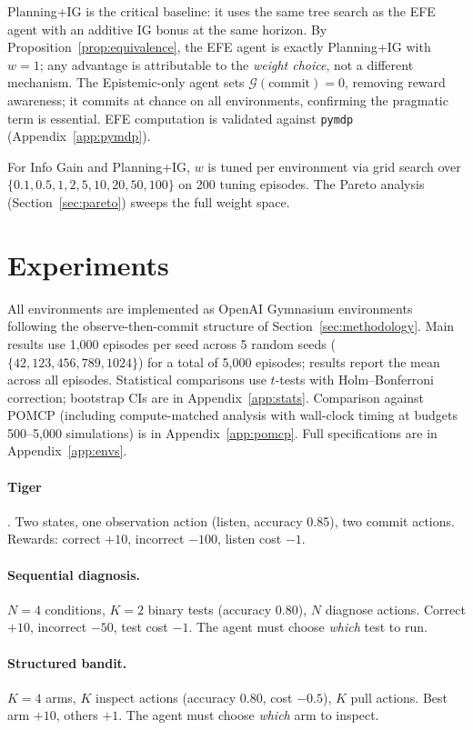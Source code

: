 \documentclass[runningheads]{llncs}
\begin{document}
Planning+IG is the critical baseline: it uses the same tree search as the EFE agent with an additive IG bonus at the same horizon. By Proposition~\ref{prop:equivalence}, the EFE agent is exactly Planning+IG with $w{=}1$; any advantage is attributable to the \emph{weight choice}, not a different mechanism. The Epistemic-only agent sets $\mathcal{G}(\text{commit}) = 0$, removing reward awareness; it commits at chance on all environments, confirming the pragmatic term is essential. EFE computation is validated against \texttt{pymdp} \citep{heins2022} (Appendix~\ref{app:pymdp}).

For Info Gain and Planning+IG, $w$ is tuned per environment via grid search over $\{0.1, 0.5, 1, 2, 5, 10, 20, 50, 100\}$ on 200 tuning episodes. The Pareto analysis (Section~\ref{sec:pareto}) sweeps the full weight space.

\section{Experiments}

All environments are implemented as OpenAI Gymnasium environments following the observe-then-commit structure of Section~\ref{sec:methodology}. Main results use 1{,}000 episodes per seed across 5 random seeds ($\{42, 123, 456, 789, 1024\}$) for a total of 5{,}000 episodes; results report the mean across all episodes. Statistical comparisons use $t$-tests with Holm--Bonferroni correction; bootstrap CIs are in Appendix~\ref{app:stats}. Comparison against POMCP (including compute-matched analysis with wall-clock timing at budgets 500--5{,}000 simulations) is in Appendix~\ref{app:pomcp}. Full specifications are in Appendix~\ref{app:envs}.

\paragraph{Tiger} \citep{kaelbling1998}. Two states, one observation action (listen, accuracy 0.85), two commit actions. Rewards: correct $+10$, incorrect $-100$, listen cost $-1$.

\paragraph{Sequential diagnosis.} $N{=}4$ conditions, $K{=}2$ binary tests (accuracy 0.80), $N$ diagnose actions. Correct $+10$, incorrect $-50$, test cost $-1$. The agent must choose \emph{which} test to run.

\paragraph{Structured bandit.} $K{=}4$ arms, $K$ inspect actions (accuracy 0.80, cost $-0.5$), $K$ pull actions. Best arm $+10$, others $+1$. The agent must choose \emph{which} arm to inspect.
\end{document}
